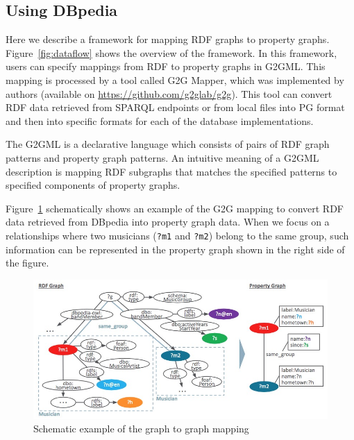\documentclass[runningheads]{llncs}
\begin{document}
\subsection{Using DBpedia}
 
Here we describe a framework for mapping RDF graphs to property graphs.
Figure~\ref{fig:dataflow} shows the overview of the framework.
In this framework, users can specify mappings from RDF to property graphs in G2GML.
This mapping is processed by a tool called G2G Mapper, which was implemented by authors (available on \url{https://github.com/g2glab/g2g}). This tool can convert RDF data retrieved from SPARQL endpoints or from local files into PG format and then into specific formats for each of the database implementations.
 
The G2GML is a declarative language which consists of pairs of RDF graph patterns and property graph patterns. 
An intuitive meaning of a G2GML description is mapping RDF subgraphs that matches the specified patterns to specified components of property graphs. 
 
Figure~\ref{fig:conversion} schematically shows an example of the G2G mapping to convert RDF data retrieved from DBpedia into property graph data. 
When we focus on a relationships where two musicians (\texttt{?m1} and \texttt{?m2}) belong to the same group, such information can be represented in the property graph shown in the right side of the figure.
 
\begin{figure}
\center
\includegraphics[width=1.0\textwidth]{example.jpg}
\caption{Schematic example of the graph to graph mapping}
\label{fig:conversion}
\end{figure}
 
\end{document}
